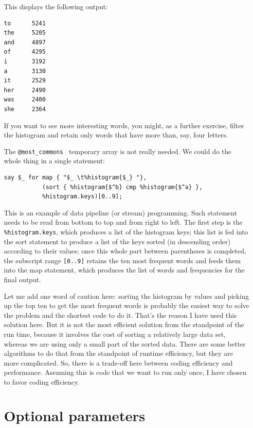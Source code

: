 This displays the following output:

\begin{verbatim}
to      5241
the     5205
and     4897
of      4295
i       3192
a       3130
it      2529
her     2490
was     2400
she     2364
\end{verbatim}
%
If you want to see more interesting words, you might, as a
further exercise, filter the histogram and retain only 
words that have more than, say, four letters.

The \verb'@most_commons ' temporary array is not really needed. 
We could do the whole thing in a single statement:

\begin{verbatim}
say $_ for map { "$_ \t%histogram{$_} "},  
           (sort { %histogram{$^b} cmp %histogram{$^a} }, 
           %histogram.keys)[0..9];
\end{verbatim}

This is an example of data pipeline (or stream) programming. Such statement 
needs to be read from bottom to top and from right to left. The 
first step is the \verb'%histogram.keys', which produces a list 
of the histogram keys; this list is fed into the sort statement 
to produce a list of the keys sorted (in descending order) according 
to their values; once this whole part between parentheses is 
completed, the subscript range \verb'[0..9]' retains the ten 
most frequent words and feeds them into the map statement, 
which produces the list of words and frequencies for the final 
output.

Let me add one word of caution here: sorting the histogram by 
values and picking up the top ten to get the most frequent 
words is probably the easiest way to solve the problem and the 
shortest code to do it. That's the reason I have used this 
solution here. But it is not the most efficient solution 
from the standpoint of the run time, because it involves the 
cost of sorting a relatively large data set, whereas we are 
using only a small part of the sorted data. There are some 
better algorithms to do that from the standpoint of runtime 
efficiency, but they are more complicated. So, there is a 
trade-off here between coding efficiency and performance. 
Assuming this is code that we want to run only once, I have 
chosen to favor coding efficiency.



\section{Optional parameters}

